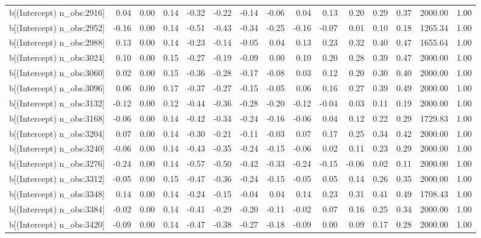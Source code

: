 \begin{table}[ht]
\begin{tabular}{rrrrrrrrrrrrrrr}
  b[(Intercept) n\_obs:2916] & 0.04 & 0.00 & 0.14 & -0.32 & -0.22 & -0.14 & -0.06 & 0.04 & 0.13 & 0.20 & 0.29 & 0.37 & 2000.00 & 1.00 \\ 
  b[(Intercept) n\_obs:2952] & -0.16 & 0.00 & 0.14 & -0.51 & -0.43 & -0.34 & -0.25 & -0.16 & -0.07 & 0.01 & 0.10 & 0.18 & 1265.34 & 1.00 \\ 
  b[(Intercept) n\_obs:2988] & 0.13 & 0.00 & 0.14 & -0.23 & -0.14 & -0.05 & 0.04 & 0.13 & 0.23 & 0.32 & 0.40 & 0.47 & 1655.64 & 1.00 \\ 
  b[(Intercept) n\_obs:3024] & 0.10 & 0.00 & 0.15 & -0.27 & -0.19 & -0.09 & 0.00 & 0.10 & 0.20 & 0.28 & 0.39 & 0.47 & 2000.00 & 1.00 \\ 
  b[(Intercept) n\_obs:3060] & 0.02 & 0.00 & 0.15 & -0.36 & -0.28 & -0.17 & -0.08 & 0.03 & 0.12 & 0.20 & 0.30 & 0.40 & 2000.00 & 1.00 \\ 
  b[(Intercept) n\_obs:3096] & 0.06 & 0.00 & 0.17 & -0.37 & -0.27 & -0.15 & -0.05 & 0.06 & 0.16 & 0.27 & 0.39 & 0.49 & 2000.00 & 1.00 \\ 
  b[(Intercept) n\_obs:3132] & -0.12 & 0.00 & 0.12 & -0.44 & -0.36 & -0.28 & -0.20 & -0.12 & -0.04 & 0.03 & 0.11 & 0.19 & 2000.00 & 1.00 \\ 
  b[(Intercept) n\_obs:3168] & -0.06 & 0.00 & 0.14 & -0.42 & -0.34 & -0.24 & -0.16 & -0.06 & 0.04 & 0.12 & 0.22 & 0.29 & 1729.83 & 1.00 \\ 
  b[(Intercept) n\_obs:3204] & 0.07 & 0.00 & 0.14 & -0.30 & -0.21 & -0.11 & -0.03 & 0.07 & 0.17 & 0.25 & 0.34 & 0.42 & 2000.00 & 1.00 \\ 
  b[(Intercept) n\_obs:3240] & -0.06 & 0.00 & 0.14 & -0.43 & -0.35 & -0.24 & -0.15 & -0.06 & 0.02 & 0.11 & 0.23 & 0.29 & 2000.00 & 1.00 \\ 
  b[(Intercept) n\_obs:3276] & -0.24 & 0.00 & 0.14 & -0.57 & -0.50 & -0.42 & -0.33 & -0.24 & -0.15 & -0.06 & 0.02 & 0.11 & 2000.00 & 1.00 \\ 
  b[(Intercept) n\_obs:3312] & -0.05 & 0.00 & 0.15 & -0.47 & -0.36 & -0.24 & -0.15 & -0.05 & 0.05 & 0.14 & 0.26 & 0.35 & 2000.00 & 1.00 \\ 
  b[(Intercept) n\_obs:3348] & 0.14 & 0.00 & 0.14 & -0.24 & -0.15 & -0.04 & 0.04 & 0.14 & 0.23 & 0.31 & 0.41 & 0.49 & 1708.43 & 1.00 \\ 
  b[(Intercept) n\_obs:3384] & -0.02 & 0.00 & 0.14 & -0.41 & -0.29 & -0.20 & -0.11 & -0.02 & 0.07 & 0.16 & 0.25 & 0.34 & 2000.00 & 1.00 \\ 
  b[(Intercept) n\_obs:3420] & -0.09 & 0.00 & 0.14 & -0.47 & -0.38 & -0.27 & -0.18 & -0.09 & 0.00 & 0.09 & 0.17 & 0.28 & 2000.00 & 1.00 \\ 

\end{tabular}
\end{table}
